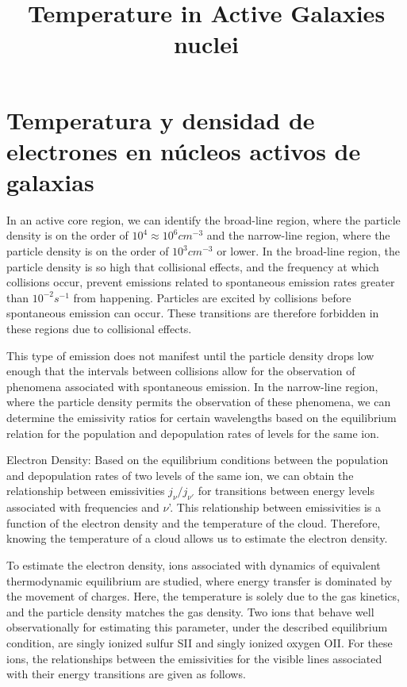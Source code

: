 \documentclass{article}
\title{Temperature in Active Galaxies nuclei}
\begin{document}
\maketitle

\section{Temperatura y densidad de electrones en núcleos activos de galaxias}

In an active core region, we can identify the broad-line region, where the particle density is on the order of $10^4\approx 10^6 cm^{−3}$ and the narrow-line region, where the particle density is on the order of $10^{3} cm^{−3}$ or lower. In the broad-line region, the particle density is so high that collisional effects, and the frequency at which collisions occur, prevent emissions related to spontaneous emission rates greater than $10^{−2}s^{−1}$ from happening. Particles are excited by collisions before spontaneous emission can occur. These transitions are therefore forbidden in these regions due to collisional effects.

This type of emission does not manifest until the particle density drops low enough that the intervals between collisions allow for the observation of phenomena associated with spontaneous emission. In the narrow-line region, where the particle density permits the observation of these phenomena, we can determine the emissivity ratios for certain wavelengths based on the equilibrium relation for the population and depopulation rates of levels for the same ion.

Electron Density: Based on the equilibrium conditions between the population and depopulation rates of two levels of the same ion, we can obtain the relationship between emissivities $j_{\nu}/j_{\nu'}$ for transitions between energy levels associated with frequencies  and $\nu$'. This relationship between emissivities is a function of the electron density and the temperature of the cloud. Therefore, knowing the temperature of a cloud allows us to estimate the electron density.

To estimate the electron density, ions associated with dynamics of equivalent thermodynamic equilibrium are studied, where energy transfer is dominated by the movement of charges. Here, the temperature is solely due to the gas kinetics, and the particle density matches the gas density. Two ions that behave well observationally for estimating this parameter, under the described equilibrium condition, are singly ionized sulfur SII and singly ionized oxygen OII. For these ions, the relationships between the emissivities for the visible lines associated with their energy transitions are given as follows.
\end{document}
